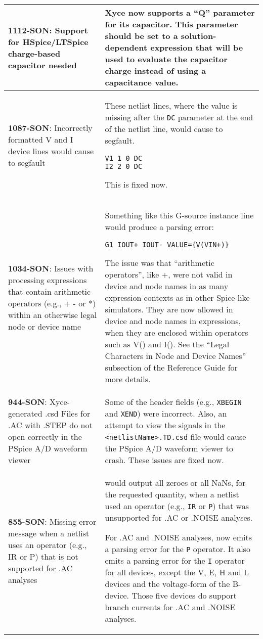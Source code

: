 {\begin{longtable}[h] {>{\raggedright\small}m{2in}|>{\raggedright\let\\\tabularnewline\small}m{3.5in}}
\textbf{1112-SON}: Support for HSpice/LTSpice charge-based capacitor needed &
 Xyce now supports a ``Q'' parameter for its capacitor.  This
 parameter should be set to a solution-dependent expression that will
 be used to evaluate the capacitor charge instead of using a
 capacitance value. \\ \hline

\textbf{1087-SON}: Incorrectly formatted V and I device lines would cause \Xyce{} to segfault  &
 These netlist lines, where the value is missing after the \texttt{DC}
 parameter at the end of the netlist line, would cause \Xyce{} to
 segfault.
\begin{verbatim}
V1 1 0 DC
I2 2 0 DC
\end{verbatim}
This is fixed now.  \\ \hline

\textbf{1034-SON}: Issues with processing expressions that contain arithmetic
operators (e.g., + - or *) within an otherwise legal node or device name &
Something like this G-source instance line would produce a parsing error:
\begin{verbatim}
G1 IOUT+ IOUT- VALUE={V(VIN+)}
\end{verbatim}
The issue was that ``arithmetic operators'', like +, were not valid in device and
node names in as many expression contexts as in other Spice-like simulators.  They are now
allowed in device and node names in expressions, when they are enclosed within \Xyce{} 
operators such as V() and I().  See the ``Legal Characters in Node
and Device Names'' subsection of the \Xyce{} Reference Guide for more details.
\\ \hline

\textbf{944-SON}: Xyce-generated .csd Files for .AC with .STEP do not 
open correctly in the PSpice A/D waveform viewer &  Some of the header 
fields (e.g., \texttt{XBEGIN} and \texttt{XEND}) were incorrect.  Also, an 
attempt to view the signals in the \texttt{<netlistName>.TD.csd} file would 
cause the PSpice A/D waveform viewer to crash.  These issues are fixed now.  
\\ \hline

\textbf{855-SON}: Missing error message when a netlist uses an operator (e.g.,
IR or P) that is not supported for .AC analyses &  \Xyce{} would output all
zeroes or all NaNs, for the requested quantity, when a netlist used an operator (e.g.,
\texttt{IR} or \texttt{P}) that was unsupported for .AC or .NOISE analyses.

For .AC and .NOISE analyses,  \Xyce{} now emits a parsing error for the \texttt{P}
operator.  It also emits a parsing error for the \texttt{I} operator for all devices,
except the V, E, H and L devices and the voltage-form of the B-device.  Those five
devices do support branch currents for .AC and .NOISE analyses. \\ \hline


\end{longtable}}
